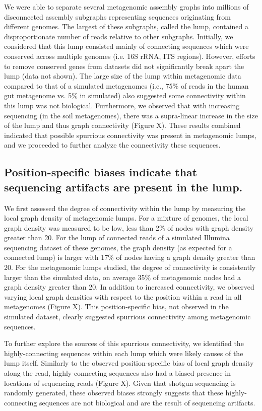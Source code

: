 \documentclass[11pt]{article} %
\begin{document}
We were able to separate several metagenomic assembly graphs into millions of disconnected assembly subgraphs representing sequences originating from different genomes.  The largest of these subgraphs, called the lump, contained a disproportionate number of reads relative to other subgraphs.  Initially, we considered that this lump consisted mainly of connecting sequences which were conserved across multiple genomes (i.e. 16S rRNA, ITS regions).  However, efforts to remove conserved genes from datasets did not significantly break apart the lump (data not shown).  The large size of the lump within metagenomic data compared to that of a simulated metagenomes (i.e., 75\% of reads in the human gut metagenome vs. 5\% in simulated) also suggested some connectivity within this lump was not biological.  Furthermore, we observed that with increasing sequencing (in the soil metagenomes), there was a supra-linear increase in the size of the lump and thus graph connectivity (Figure X). These results combined indicated that possible spurrious connectivity was present in metagenomic lumps, and we proceeded to further analyze the connectivity these sequences.

\subsection{Position-specific biases indicate that sequencing artifacts are present in the lump.}
We first assessed the degree of connectivity within the lump by measuring the local graph density of metagenomic lumps.  For a mixture of genomes, the local graph density was measured to be low, less than 2\% of nodes with graph density greater than 20.  For the lump of connected reads of a simulated Illumina sequencing dataset of these genomes, the graph density (as expected for a connected lump) is larger with 17\% of nodes having a graph density greater than 20.  For the metagenomic lumps studied, the degree of connectivity is consistently larger than the simulated data, on average 35\% of metagenomic nodes had a graph density greater than 20.   In addition to increased connectivity, we observed varying local graph densities with respect to the position within a read in all metagenomes (Figure X).  This position-specific bias, not observed in the simulated dataset, clearly suggested spurrious connectivity among metagenomic sequences.

To further explore the sources of this spurrious connectivity, we identified the highly-connecting sequences within each lump which were likely causes of the lump itself.  Similarly to the observed position-specific bias of local graph density along the read, highly-connecting sequences also had a biased presence in locations of sequencing reads (Figure X).  Given that shotgun sequencing is randomly generated, these observed biases strongly suggests that these highly-connecting sequences are not biological and are the result of sequencing artifacts.  
\end{document}
